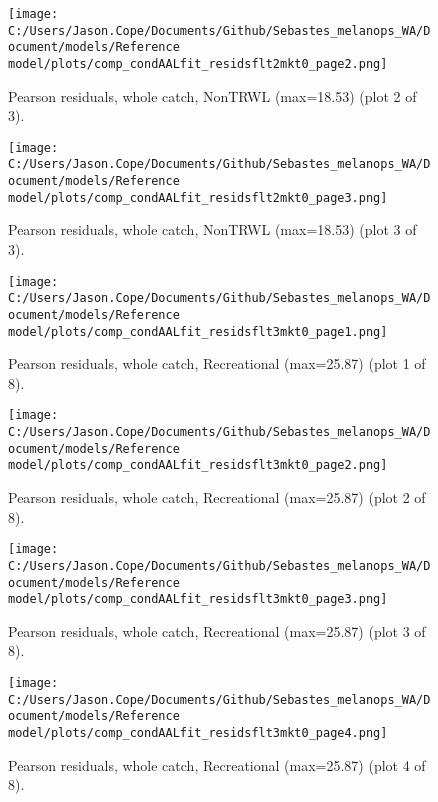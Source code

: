 \documentclass[11pt,
  english,
  letterpaper,
]{article}
\begin{document}
\begin{figure}
\centering
\texttt{[image: C:/Users/Jason.Cope/Documents/Github/Sebastes\_melanops\_WA/Document/models/Reference model/plots/comp\_condAALfit\_residsflt2mkt0\_page2.png]}
\caption{Pearson residuals, whole catch, NonTRWL (max=18.53) (plot 2 of 3).\label{fig:comp_condAALfit_residsflt2mkt0_page2}}
\end{figure}

\begin{figure}
\centering
\texttt{[image: C:/Users/Jason.Cope/Documents/Github/Sebastes\_melanops\_WA/Document/models/Reference model/plots/comp\_condAALfit\_residsflt2mkt0\_page3.png]}
\caption{Pearson residuals, whole catch, NonTRWL (max=18.53) (plot 3 of 3).\label{fig:comp_condAALfit_residsflt2mkt0_page3}}
\end{figure}

\begin{figure}
\centering
\texttt{[image: C:/Users/Jason.Cope/Documents/Github/Sebastes\_melanops\_WA/Document/models/Reference model/plots/comp\_condAALfit\_residsflt3mkt0\_page1.png]}
\caption{Pearson residuals, whole catch, Recreational (max=25.87) (plot 1 of 8).\label{fig:comp_condAALfit_residsflt3mkt0_page1}}
\end{figure}

\begin{figure}
\centering
\texttt{[image: C:/Users/Jason.Cope/Documents/Github/Sebastes\_melanops\_WA/Document/models/Reference model/plots/comp\_condAALfit\_residsflt3mkt0\_page2.png]}
\caption{Pearson residuals, whole catch, Recreational (max=25.87) (plot 2 of 8).\label{fig:comp_condAALfit_residsflt3mkt0_page2}}
\end{figure}

\begin{figure}
\centering
\texttt{[image: C:/Users/Jason.Cope/Documents/Github/Sebastes\_melanops\_WA/Document/models/Reference model/plots/comp\_condAALfit\_residsflt3mkt0\_page3.png]}
\caption{Pearson residuals, whole catch, Recreational (max=25.87) (plot 3 of 8).\label{fig:comp_condAALfit_residsflt3mkt0_page3}}
\end{figure}

\begin{figure}
\centering
\texttt{[image: C:/Users/Jason.Cope/Documents/Github/Sebastes\_melanops\_WA/Document/models/Reference model/plots/comp\_condAALfit\_residsflt3mkt0\_page4.png]}
\caption{Pearson residuals, whole catch, Recreational (max=25.87) (plot 4 of 8).\label{fig:comp_condAALfit_residsflt3mkt0_page4}}
\end{figure}
\end{document}
